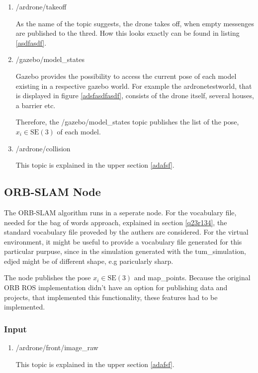 \begin{enumerate}
	\item{/ardrone/takeoff}
	
	As the name of the topic suggests, the drone takes off, when empty messenges are published to the thred. How this looks exactly can be found in 
	listing \ref{asdfasdf}.
	
	\item{/gazebo/model\_states}
	
	Gazebo provides the possibility to access the current pose of each model existing in a respective gazebo world. For example the ardronetestworld, 
	that is displayed in figure \ref{adsfasdfasdf}, consists of the drone itself, several houses, a barrier etc.
	
	Therefore, the /gazebo/model\_states topic 
	publishes the list of the pose, $x_i \in \text{SE}(3)$ of each model.
	
	\item{/ardrone/collision}
	
	This topic is explained in the upper section \ref{adafsf}.
	
	\end{enumerate}
	
	
	
	\subsection{ORB-SLAM Node}
	
	The ORB-SLAM algorithm runs in a seperate node. For the vocabulary file, needed for the bag of words approach, explained in section \ref{q23r134}, the 
	standard vocabulary file proveded by the authers are considered. For the virtual environment, it might be useful to provide a vocabulary file 
	generated for this particular purpuse, since in the simulation generated with the tum\_simulation, edjed might be of different shape, e.g paricularly sharp. 
	
	The node publishes the pose $x_i \in \text{SE}(3)$ and map\_points. Because the original ORB ROS implementation didn't have an option for publishing data and 
	projects, that implemented this functionality, these features had to be implemented. 
	
	\subsubsection{Input}
	
	\begin{enumerate}
	\item{/ardrone/front/image\_raw}
	
	This topic is explained in the upper section \ref{adafsf}.
	
	\end{enumerate}
	
